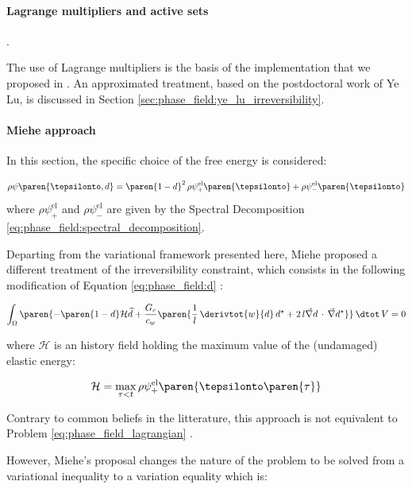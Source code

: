 \paragraph{Lagrange multipliers and active sets}

\cite{heister_primal-dual_2015, jodlbauer_parallel_2020}.

The use of Lagrange multipliers is the basis of the implementation that
we proposed in \cite{helfer_phase-field_2018}. An approximated treatment,
based on the postdoctoral work of Ye Lu, is discussed in Section
\ref{sec:phase_field:ye_lu_irreversibility}.

\paragraph{Miehe approach \cite{miehe_phase_2010}}

In this section, the specific choice of the free energy is considered:

\begin{equation}
    \rho\psi\paren{\tepsilonto,d}=\paren{1-d}^{2}\,\rho\psi^{\mathrm{el}}_{+}\paren{\tepsilonto}+\rho\psi^{\mathrm{el}}_{-}\paren{\tepsilonto}
\end{equation}
%
%
%
where \(\rho\psi^{\mathrm{el}}_{+}\) and
\(\rho\psi^{\mathrm{el}}_{-}\) are given by the Spectral Decomposition
\eqref{eq:phase_field:spectral_decomposition}.

Departing from the variational framework presented here, Miehe proposed
a different treatment of the irreversibility constraint, which consists
in the following modification of Equation \eqref{eq:phase_field:d}
\cite{miehe_phase_2010}:

\[
\int_\Omega \paren{-\paren{1-d}\mathcal{H}\widehat{d}+\dfrac{G_c}{c_w}\paren{\dfrac{1}{l}\,\derivtot{w}{d}\,d^{\star} + 2\,l \vec{\nabla} d\, \cdot\, \vec{\nabla} d^{\star}}} \,\dtot\,V = 0
\]

where \(\mathcal{H}\) is an history field holding the maximum value of
the (undamaged) elastic energy:

\[
\mathcal{H}=\underset{\tau<t}{\max}\, \rho\psi^{\mathrm{el}}_{+}\paren{\tepsilonto\paren{\tau}}
\]

Contrary to common beliefs in the litterature, this approach is not
equivalent to Problem \eqref{eq:phase_field_lagrangian}
\cite{gerasimov_numerical_2020}.

However, Miehe's proposal changes the nature of the problem to be solved
from a variational inequality to a variation equality which is:

